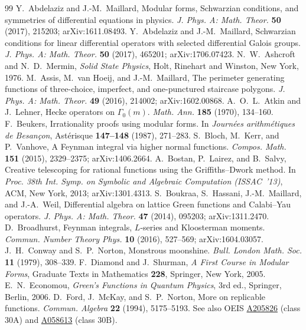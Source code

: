 \documentclass[11pt]{article}
\theoremstyle{plain}
\theoremstyle{remark}
\begin{document}
\begin{thebibliography}{99}
 Y.~Abdelaziz and J.-M.~Maillard, Modular forms, Schwarzian conditions, and symmetries of differential equations in physics. \textit{J. Phys. A: Math. Theor.} \textbf{50} (2017), 215203; arXiv:1611.08493.
 Y.~Abdelaziz and J.-M.~Maillard, Schwarzian conditions for linear differential operators with selected differential Galois groups. \textit{J. Phys. A: Math. Theor.} \textbf{50} (2017), 465201; arXiv:1706.07423.
 N.~W.~Ashcroft and N.~D.~Mermin, \textit{Solid State Physics}, Holt, Rinehart and Winston, New York, 1976.
 M.~Assis, M.~van Hoeij, and J.-M.~Maillard, The perimeter generating functions of three-choice, imperfect, and one-punctured staircase polygons. \textit{J. Phys. A: Math. Theor.} \textbf{49} (2016), 214002; arXiv:1602.00868.
 A.~O.~L.~Atkin and J.~Lehner, Hecke operators on $\Gamma_0(m)$. \textit{Math. Ann.} \textbf{185} (1970), 134--160.
 F.~Beukers, Irrationality proofs using modular forms. In \textit{Journ\'ees arithm\'etiques de Besan\c{c}on}, Ast\'erisque \textbf{147--148} (1987), 271--283.
 S.~Bloch, M.~Kerr, and P.~Vanhove, A Feynman integral via higher normal functions. \textit{Compos. Math.} \textbf{151} (2015), 2329--2375; arXiv:1406.2664.
 A.~Bostan, P.~Lairez, and B.~Salvy, Creative telescoping for rational functions using the Griffiths--Dwork method. In \textit{Proc. 38th Int. Symp. on Symbolic and Algebraic Computation (ISSAC~'13)}, ACM, New York, 2013; arXiv:1301.4313.
 S.~Boukraa, S.~Hassani, J.-M.~Maillard, and J.-A.~Weil, Differential algebra on lattice Green functions and Calabi--Yau operators. \textit{J. Phys. A: Math. Theor.} \textbf{47} (2014), 095203; arXiv:1311.2470.
 D.~Broadhurst, Feynman integrals, $L$-series and Kloosterman moments. \textit{Commun. Number Theory Phys.} \textbf{10} (2016), 527--569; arXiv:1604.03057.
 J.~H.~Conway and S.~P.~Norton, Monstrous moonshine. \textit{Bull. London Math. Soc.} \textbf{11} (1979), 308--339.
 F.~Diamond and J.~Shurman, \textit{A First Course in Modular Forms}, Graduate Texts in Mathematics \textbf{228}, Springer, New York, 2005.
 E.~N.~Economou, \textit{Green's Functions in Quantum Physics}, 3rd ed., Springer, Berlin, 2006.
 D.~Ford, J.~McKay, and S.~P.~Norton, More on replicable functions. \textit{Commun. Algebra} \textbf{22} (1994), 5175--5193. See also OEIS \href{https://oeis.org/A205826}{A205826} (class $30\mathrm{A}$) and \href{https://oeis.org/A058613}{A058613} (class $30\mathrm{B}$).

\end{thebibliography}
\end{document}
